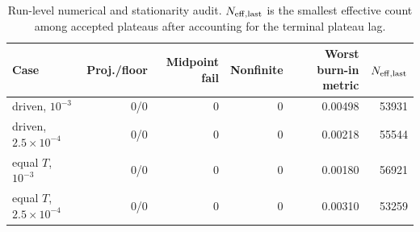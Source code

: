 \begin{table}[t]\centering\small
\caption{Run-level numerical and stationarity audit.  $N_{\rm eff,last}$ is the smallest effective count among accepted plateaus after accounting for the terminal plateau lag.}\label{tab:audit}
\begin{tabular}{lrrrrr}\toprule Case & Proj./floor & Midpoint fail & Nonfinite & Worst burn-in metric & $N_{\rm eff,last}$\\\midrule
driven, $10^{-3}$ & 0/0 & 0 & 0 & 0.00498 & 53931 \\
driven, $2.5\!\times\!10^{-4}$ & 0/0 & 0 & 0 & 0.00218 & 55544 \\
equal $T$, $10^{-3}$ & 0/0 & 0 & 0 & 0.00180 & 56921 \\
equal $T$, $2.5\!\times\!10^{-4}$ & 0/0 & 0 & 0 & 0.00310 & 53259 \\
\bottomrule\end{tabular}\end{table}
